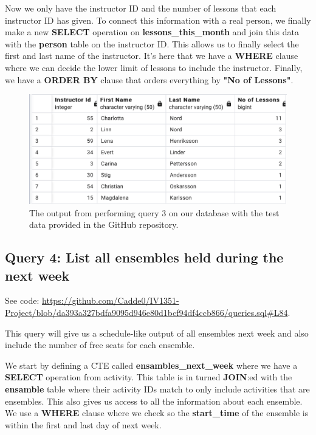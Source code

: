 \documentclass[a4paper]{scrartcl}
\begin{document}
Now we only have the instructor ID and the number of lessons that each instructor ID has given. To connect this information with a real person, we finally make a new \textbf{SELECT} operation on \textbf{lessons\_this\_month} and join this data with the \textbf{person} table on the instructor ID. This allows us to finally select the first and last name of the instructor. It's here that we have a \textbf{WHERE} clause where we can decide the lower limit of lessons to include the instructor. Finally, we have a \textbf{ORDER BY} clause that orders everything by \textbf{"No of Lessons"}.

\begin{figure}[H]
    \begin{center}
      \includegraphics[scale=0.6]{query3_output.png}
      \caption{The output from performing query 3 on our database with the test data provided in the GitHub repository.}
      \label{fig:diag}
    \end{center}
  \end{figure}

\subsection{Query 4: List all ensembles held during the next week}
See code: \url{https://github.com/Cadde0/IV1351-Project/blob/da393a327bdfa9095d946e80d1bcf94df4ccb866/queries.sql#L84}.

This query will give us a schedule-like output of all ensembles next week and also include the number of free seats for each ensemble.

We start by defining a CTE called \textbf{ensambles\_next\_week} where we have a \textbf{SELECT} operation from activity. This table is in turned \textbf{JOIN}:ed with the \textbf{ensamble} table where their activity IDs match to only include activities that are ensembles. This also gives us access to all the information about each ensemble. We use a \textbf{WHERE} clause where we check so the \textbf{start\_time} of the ensemble is within the first and last day of next week.
\end{document}
